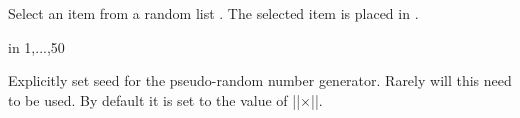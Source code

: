 \begin{command}{\pgfmathrandomitem{}}
	Select an item from a random list . The
	selected item is placed in .
\end{command}

\begin{codeexample}[]
\begin{pgfpicture}
   \foreach \a in {1,...,50}{
      \color{\c!40!white}
   }	  
\end{pgfpicture}
\end{codeexample}

\begin{command}{\pgfmathsetseed{}}
	Explicitly set seed for the pseudo-random number generator. Rarely will 
	this need to be used. By default it is set to the value of 
	|\time|$\times$|\year|.
\end{command}